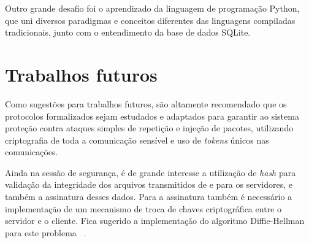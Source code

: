     Outro grande desafio foi o aprendizado da linguagem de programação Python, que uni diversos paradigmas e conceitos diferentes das linguagens compiladas tradicionais, junto com o entendimento da base de dados SQLite.
    
    \section{Trabalhos futuros}
    
    Como sugestões para trabalhos futuros, são altamente recomendado que os protocolos formalizados sejam estudados e adaptados para garantir ao sistema proteção contra ataques simples de repetição e injeção de pacotes, utilizando criptografia de toda a comunicação sensível e uso de \textit{tokens} únicos nas comunicações.
    
    Ainda na sessão de segurança, é de grande interesse a utilização de \textit{hash} para validação da integridade dos arquivos transmitidos de e para os servidores, e também a assinatura desses dados. Para a assinatura também é necessário a implementação de um mecanismo de troca de chaves criptográfica entre o servidor e o cliente. Fica sugerido a implementação do algoritmo Diffie-Hellman  para este problema ~\cite{merkle1978secure}.
    
    


    
    
    